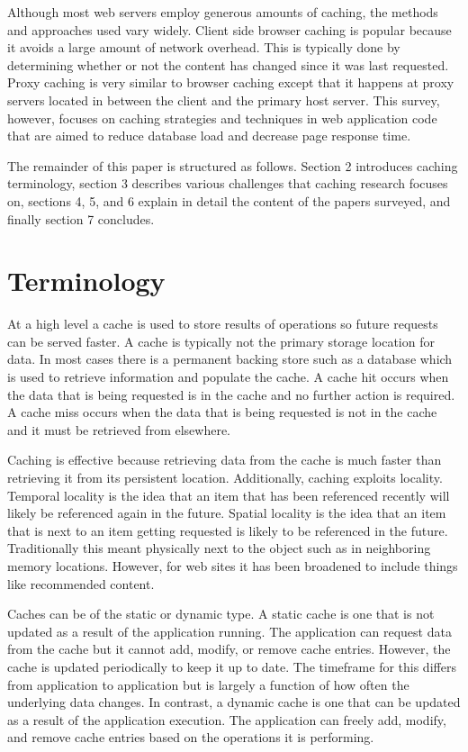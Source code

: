 \documentclass[12pt]{ucthesis}
\begin{document}
Although most web servers employ generous amounts of caching, the methods and approaches used vary widely.
Client side browser caching is popular because it avoids a large amount of network overhead.
This is typically done by determining whether or not the content has changed since it was last requested.
Proxy caching is very similar to browser caching except that it happens at proxy servers located in between the client and the primary host server.
This survey, however, focuses on caching strategies and techniques in web application code that are aimed to reduce database load and decrease page response time.

The remainder of this paper is structured as follows.
Section 2 introduces caching terminology, section 3 describes various challenges that caching research focuses on, sections 4, 5, and 6 explain in detail the content of the papers surveyed, and finally section 7 concludes.

\section{Terminology}
At a high level a cache is used to store results of operations so future requests can be served faster.
A cache is typically not the primary storage location for data.
In most cases there is a permanent backing store such as a database which is used to retrieve information and populate the cache.
A cache hit occurs when the data that is being requested is in the cache and no further action is required.
A cache miss occurs when the data that is being requested is not in the cache and it must be retrieved from elsewhere.

Caching is effective because retrieving data from the cache is much faster than retrieving it from its persistent location.
Additionally, caching exploits locality.
Temporal locality is the idea that an item that has been referenced recently will likely be referenced again in the future.
Spatial locality is the idea that an item that is next to an item getting requested is likely to be referenced in the future.
Traditionally this meant physically next to the object such as in neighboring memory locations.
However, for web sites it has been broadened to include things like recommended content.

Caches can be of the static or dynamic type.
A static cache is one that is not updated as a result of the application running.
The application can request data from the cache but it cannot add, modify, or remove cache entries.
However, the cache is updated periodically to keep it up to date.
The timeframe for this differs from application to application but is largely a function of how often the underlying data changes.
In contrast, a dynamic cache is one that can be updated as a result of the application execution.
The application can freely add, modify, and remove cache entries based on the operations it is performing.
\end{document}
